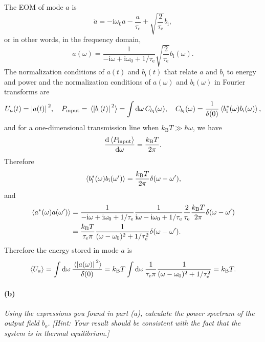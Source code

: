 \documentclass[hyperref, a4paper]{article}
\newcommand*{\ii}{\mathrm{i}}
\newcommand*{\kB}{k_{\text{B}}}
\newcommand*{\taue}{\tau_{\text{e}}}
\newcommand*{\bi}{b_{\text{i}}}
\begin{document}
The EOM of mode $a$ is  
\begin{equation}
    \dot{a} = - \ii \omega_0 a - \frac{a}{\taue} + \sqrt{\frac{2}{\taue}} \bi,
\end{equation}
or in other words, in the frequency domain,
\begin{equation}
    a(\omega) = \frac{1}{- \ii \omega + \ii \omega_0 + 1 / \taue} \sqrt{\frac{2}{\taue}} \bi(\omega).
\end{equation}
The normalization conditions of $a(t)$ and $\bi(t)$ that relate $a$ and $\bi$ to energy and power 
and the normalization conditions of $a(\omega)$ and $\bi(\omega)$ in Fourier transforms are 
\begin{equation}
    U_a(t) = \abs*{a(t)}^2, \quad 
    P_{\text{input}} = \expval*{\abs*{\bi(t)}^2} = \int \dd{\omega} C_{\bi}(\omega), \quad 
    C_{\bi}(\omega) = \frac{1}{\delta(0)} \expval*{\bi^*(\omega) \bi(\omega)},
    \label{eq:bi-normalization}
\end{equation}
and for a one-dimensional transmission line when $\kB T \gg \hbar \omega$, we have 
\begin{equation}
    \dv{\expval*{P_{\text{input}}}}{\omega} = \frac{\kB T}{2 \pi}.
\end{equation}
Therefore 
\begin{equation}
    \expval*{\bi^*(\omega) \bi(\omega')} = \frac{\kB T}{2\pi} \delta(\omega - \omega'),
\end{equation} 
and 
\begin{equation}
    \begin{aligned}
        \expval*{a^*(\omega) a(\omega')} &= 
        \frac{1}{- \ii \omega + \ii \omega_0 + 1 / \taue} 
        \frac{1}{  \ii \omega - \ii \omega_0 + 1 / \taue} 
        \frac{2}{\taue} \frac{\kB T}{2\pi} \delta(\omega - \omega') \\
        &= \frac{\kB T}{\taue \pi} \frac{1}{(\omega - \omega_0)^2 + 1 / \taue^2} \delta(\omega - \omega').
    \end{aligned}
    \label{eq:a-correlation}
\end{equation}
Therefore the energy stored in mode $a$ is 
\begin{equation}
    \expval{U_a} = \int \dd{\omega} \frac{\expval*{\abs*{a(\omega)}^2}}{\delta(0)}
    = \kB T \int \dd{\omega} \frac{1}{\taue \pi} \frac{1}{(\omega - \omega_0)^2 + 1 / \taue^2}
    = \kB T.
    \label{eq:single-mode-energy}
\end{equation}

\paragraph*{(b)} \textit{Using the expressions you found in part (a), calculate the power spectrum of the output field $b_o$. [Hint: Your result should be consistent with the fact that the system is in thermal equilibrium.]} 
\end{document}

